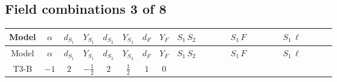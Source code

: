 \documentclass[8pt]{article}
\begin{document}
\begin{landscape}
\subsection*{Field combinations 3 of 8}
\begin{longtable}{@{}cccccccc >{\raggedright\arraybackslash}p{0.21\linewidth} >{\raggedright\arraybackslash}p{0.21\linewidth} >{\raggedright\arraybackslash}p{0.21\linewidth}@{}}
\toprule
Model & $\alpha$ & $d_{S_1}$ & $Y_{S_1}$ & $d_{S_2}$ & $Y_{S_2}$ & $d_F$ & $Y_F$ & $S_1\,S_2$ & $S_1\,F$ & $S_1\,\ell$ \\
\midrule
\endfirsthead
\toprule
Model & $\alpha$ & $d_{S_1}$ & $Y_{S_1}$ & $d_{S_2}$ & $Y_{S_2}$ & $d_F$ & $Y_F$ & $S_1\,S_2$ & $S_1\,F$ & $S_1\,\ell$ \\
\midrule
\endhead
T3-B & $-1$ & $2$ & $-\frac{1}{2}$ & $2$ & $\frac{1}{2}$ & $1$ & $0$ & \scriptsize\adjustbox{max width=\linewidth}{$\begin{gathered} +\text{CNewScalar1NewScalar2} \hbar  S_{1,j_1} S_{2,j_2} \text{Bar}(\text{cg1})_{j_1,j_2} \\ +\frac{1}{2} C_{S_2^\dagger S_2} \hbar  \overline{y_{2,i_1,r_1}} S_{1,j_1} S_{2,j_2} y_{1,i_1,r_1} \text{Bar}(\text{cg1})_{j_1,j_2} \\ +\frac{C_{S_2^\dagger S_2} \hbar  \overline{y_{2,i_1,r_1}} S_{1,j_1} S_{2,j_2} y_{1,i_1,r_1} \text{Bar}(\text{cg1})_{j_1,j_2}}{\epsilon }\end{gathered}$} & \scriptsize\adjustbox{max width=\linewidth}{$\begin{gathered} -C_{S_1^\dagger S_1} \hbar  \log \left(\frac{\bar{\mu}^{2}}{M_F^2}\right) \overline{y_{1,i_1,r_1}} S_{1,j_1} y_{1,i_1,r_1} S_{1,j_1}{}^{\dagger } \\ -\hbar  \log \left(\frac{\bar{\mu}^{2}}{M_F^2}\right) \overline{y_{1,i_1,r_1}} \overline{y_{1,i_2,r_2}} S_{1,j_1} S_{1,j_2} y_{1,i_1,r_2} y_{1,i_2,r_1} S_{1,j_1}{}^{\dagger } S_{1,j_2}{}^{\dagger } \\ -\hbar  \log \left(\frac{\bar{\mu}^{2}}{M_F^2}\right) \overline{y_{1,i_1,r_1}} S_{1,j_3} S_{1,j_4} y_{1,i_1,r_1} S_{1,j_1}{}^{\dagger } S_{1,j_2}{}^{\dagger } \mathcal{I}_{S_1,j_1,j_3,j_2,j_4}{}^1 \lambda_{S_1}^{(1)}^{(1)}\end{gathered}$} & \scriptsize\adjustbox{max width=\linewidth}{$\begin{gathered} \frac{3 \hbar  \overline{L_{a_1,i_1}}\, C\, P_R\, \overline{L_{a_2,i_2}}{}^T S_{1,j_1} S_{1,j_2} y_{1,i_1,r_1} y_{1,i_2,r_1} \mathcal{I}_{y_1,a_1,j_1} \mathcal{I}_{y_1,a_2,j_2} g_2^2}{8 \epsilon  M_F} \\ +\frac{\hbar  \overline{L_{a_1,i_1}}\, C\, P_R\, \overline{L_{a_2,i_2}}{}^T S_{1,j_1} S_{1,j_2} y_{1,i_1,r_1} y_{1,i_2,r_1} \mathcal{I}_{y_1,a_1,j_1} \mathcal{I}_{y_1,a_2,j_2} g_2^2}{8 M_F} \\ +\frac{3 \hbar  \overline{y_{1,i_1,r_1}} \overline{y_{1,i_2,r_1}} L_{a_2,i_2}{}^T\, C\, P_L\, L_{a_1,i_1} {\mathcal{C}_{LS_1F}}^{*}_{a_1,j_1} {\mathcal{C}_{LS_1F}}^{*}_{a_2,j_2} S_{1,j_1}{}^{\dagger } S_{1,j_2}{}^{\dagger } g_2^2}{8 \epsilon  M_F}\end{gathered}$} \\

\end{longtable}
\end{landscape}
\end{document}
